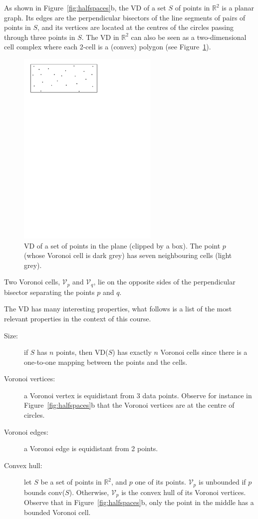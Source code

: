 %

As shown in Figure~\ref{fig:halfspaces}b, the VD of a set $S$ of points in $\mathbb{R}^2$ is a planar graph. 
Its edges are the perpendicular bisectors of the line segments of pairs of points in $S$, and its vertices are located at the centres of the circles passing through three points in $S$. 
The VD in $\mathbb{R}^2$ can also be seen as a two-dimensional cell complex where each 2-cell is a (convex) polygon (see Figure~\ref{fig:vd2d}). 
\begin{figure}
  \centering
  \includegraphics[page=3,width=0.6\textwidth]{figs/vd2d}
  \caption{VD of a set of points in the plane (clipped by a box). The point $p$ (whose Voronoi cell is dark grey) has seven neighbouring cells (light grey).} 
\label{fig:vd2d}
\end{figure}
Two Voronoi cells, $\mathcal{V}_{p}$ and $\mathcal{V}_{q}$, lie on the opposite sides of the perpendicular bisector separating the points $p$ and $q$. 

%

The VD has many interesting properties, what follows is a list of the most relevant properties in the context of this course.
\begin{description}
  \item[Size:] if $S$ has $n$ points, then VD($S$) has exactly $n$ Voronoi cells since there is a one-to-one mapping between the points and the cells.
  \item[Voronoi vertices:] a Voronoi vertex is equidistant from 3 data points. Observe for instance in Figure~\ref{fig:halfspaces}b that the Voronoi vertices are at the centre of circles.
  \item[Voronoi edges:] a Voronoi edge is equidistant from 2 points.
  \item[Convex hull:] let $S$ be a set of points in $\mathbb{R}^2$, and $p$ one of its points. $\mathcal{V}_{p}$ is unbounded if $p$ bounds conv($S$). Otherwise, $\mathcal{V}_{p}$ is the convex hull of its Voronoi vertices. Observe that in Figure~\ref{fig:halfspaces}b, only the point in the middle has a bounded Voronoi cell.
\end{description}
  

